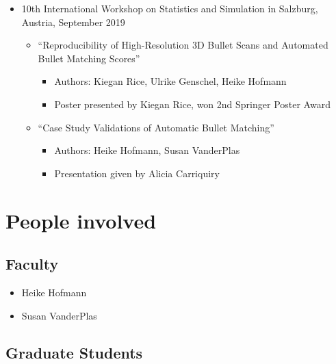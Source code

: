 \documentclass[]{book}
\providecommand{\tightlist}{%
  \setlength{\itemsep}{0pt}\setlength{\parskip}{0pt}}
\begin{document}
\begin{itemize}
\item
  10th International Workshop on Statistics and Simulation in Salzburg, Austria, September 2019

  \begin{itemize}
  \tightlist
  \item
    ``Reproducibility of High-Resolution 3D Bullet Scans and Automated Bullet Matching Scores''

    \begin{itemize}
    \tightlist
    \item
      Authors: Kiegan Rice, Ulrike Genschel, Heike Hofmann
    \item
      Poster presented by Kiegan Rice, won 2nd Springer Poster Award\\
    \end{itemize}
  \item
    ``Case Study Validations of Automatic Bullet Matching''

    \begin{itemize}
    \tightlist
    \item
      Authors: Heike Hofmann, Susan VanderPlas
    \item
      Presentation given by Alicia Carriquiry
    \end{itemize}
  \end{itemize}
\end{itemize}

\hypertarget{people-involved}{%
\section{People involved}\label{people-involved}}

\hypertarget{faculty}{%
\subsection{Faculty}\label{faculty}}

\begin{itemize}
\tightlist
\item
  Heike Hofmann
\item
  Susan VanderPlas
\end{itemize}

\hypertarget{graduate-students}{%
\subsection{Graduate Students}\label{graduate-students}}
\end{document}
